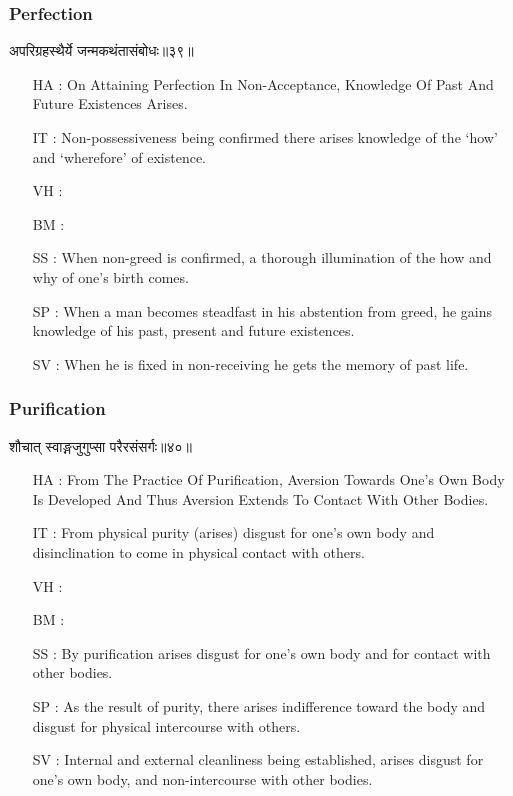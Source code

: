 \begin{frame}[fragile]\frametitle{Perfection}
\begin{sanskrit}
अपरिग्रहस्थैर्ये जन्मकथंतासंबोधः॥३९॥
\end{sanskrit}

	\begin{itemize}
	\item [HA]: On Attaining Perfection In Non-Acceptance, Knowledge Of Past And Future Existences Arises.
	\item [IT]: Non-possessiveness being confirmed there arises knowledge of the ‘how’ and ‘wherefore’ of existence.
	\item [VH]: 
	\item [BM]: 
	\item [SS]: When non-greed is confirmed, a thorough illumination of the how and why of one’s birth comes.
	\item [SP]: When a man becomes steadfast in his abstention from greed, he gains knowledge of his past, present and future existences.
	\item [SV]: When he is fixed in non-receiving he gets the memory of past life. 
	\end{itemize}
\end{frame}



\begin{frame}[fragile]\frametitle{Purification}
\begin{sanskrit}
शौचात् स्वाङ्गजुगुप्सा परैरसंसर्गः॥४०॥
\end{sanskrit}

	\begin{itemize}
	\item [HA]: From The Practice Of Purification, Aversion Towards One’s Own Body Is Developed And Thus Aversion Extends To Contact With Other Bodies.
	\item [IT]: From physical purity (arises) disgust for one’s own body and disinclination to come in physical contact with others.
	\item [VH]: 
	\item [BM]: 
	\item [SS]: By purification arises disgust for one’s own body and for contact with other bodies.
	\item [SP]: As the result of purity, there arises indifference toward the body and disgust for physical intercourse with others.
	\item [SV]: Internal and external cleanliness being established, arises disgust for one’s own body, and non-intercourse with other bodies. 
	\end{itemize}
\end{frame}




